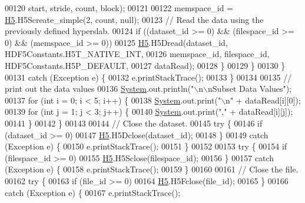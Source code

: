 \begin{DoxyCode}
00120                             start, stride, count, block);
00121 
00122                     memspace\_id = \hyperlink{namespace_h5}{H5}.H5Screate\_simple(2, count, null);
00123                     \textcolor{comment}{// Read the data using the previously defined hyperslab.}
00124                     \textcolor{keywordflow}{if} ((dataset\_id >= 0) && (filespace\_id >= 0) && (memspace\_id >= 0))
00125                         \hyperlink{namespace_h5}{H5}.H5Dread(dataset\_id, HDF5Constants.H5T\_NATIVE\_INT,
00126                                 memspace\_id, filespace\_id, HDF5Constants.H5P\_DEFAULT,
00127                                 dataRead);
00128                 \}
00129             \}
00130         \}
00131         \textcolor{keywordflow}{catch} (Exception e) \{
00132             e.printStackTrace();
00133         \}
00134 
00135         \textcolor{comment}{// print out the data values}
00136         \hyperlink{namespace_system}{System}.out.println(\textcolor{stringliteral}{"\(\backslash\)n\(\backslash\)nSubset Data Values"});
00137         \textcolor{keywordflow}{for} (\textcolor{keywordtype}{int} i = 0; i < 5; i++) \{
00138             \hyperlink{namespace_system}{System}.out.print(\textcolor{stringliteral}{"\(\backslash\)n"} + dataRead[i][0]);
00139             \textcolor{keywordflow}{for} (\textcolor{keywordtype}{int} j = 1; j < 3; j++) \{
00140                 \hyperlink{namespace_system}{System}.out.print(\textcolor{stringliteral}{","} + dataRead[i][j]);
00141             \}
00142         \}
00143 
00144         \textcolor{comment}{// Close the dataset.}
00145         \textcolor{keywordflow}{try} \{
00146             \textcolor{keywordflow}{if} (dataset\_id >= 0)
00147                 \hyperlink{namespace_h5}{H5}.H5Dclose(dataset\_id);
00148         \}
00149         \textcolor{keywordflow}{catch} (Exception e) \{
00150             e.printStackTrace();
00151         \}
00152 
00153         \textcolor{keywordflow}{try} \{
00154             \textcolor{keywordflow}{if} (filespace\_id >= 0)
00155                 \hyperlink{namespace_h5}{H5}.H5Sclose(filespace\_id);
00156         \}
00157         \textcolor{keywordflow}{catch} (Exception e) \{
00158             e.printStackTrace();
00159         \}
00160 
00161         \textcolor{comment}{// Close the file.}
00162         \textcolor{keywordflow}{try} \{
00163             \textcolor{keywordflow}{if} (file\_id >= 0)
00164                 \hyperlink{namespace_h5}{H5}.H5Fclose(file\_id);
00165         \}
00166         \textcolor{keywordflow}{catch} (Exception e) \{
00167             e.printStackTrace();

\end{DoxyCode}
